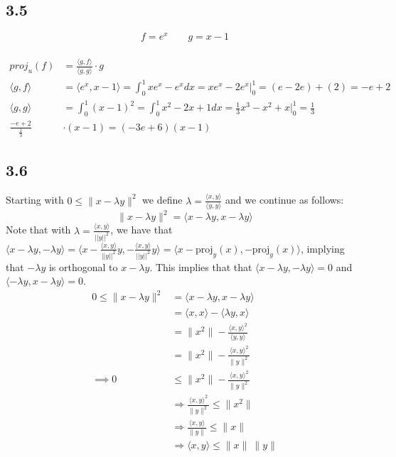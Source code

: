 \documentclass[letterpaper,12pt]{article}
\theoremstyle{definition}
\begin{document}
\subsection*{3.5}
\[f = e^{x} ~~~~~~~~~ g = x-1 \] \\
\begin{align*}
proj_{u}(f) &= \frac{\langle g,f\rangle }{\langle g,g\rangle } \cdot g \\
\langle g,f\rangle  &= \langle e^{x}, x-1\rangle  = \int_{0}^{1}xe^{x} - e^{x} dx = xe^{x} - 2e^{x} |_{0}^{1} = (e-2e) + (2) = -e +2 \\ 
\langle g,g\rangle  &= \int_{0}^{1}(x-1)^{2} = \int_{0}^{1} x^{2} - 2x + 1 dx = \frac{1}{3}x^{3} - x^{2} + x |_{0}^{1} = \frac{1}{3} \\
\frac{-e+2}{\frac{1}{3}} &\cdot(x-1) = (-3e+6)(x-1)
\end{align*}

\subsection*{3.6}
Starting with  $0\leq\|x-\lambda y\|^{2}$ we define $\lambda = \frac{\langle x,y\rangle }{\langle y,y\rangle }$ and we continue as follows:
\[\|x-\lambda y\|^{2} = \langle x-\lambda y, x-\lambda y\rangle \]
Note that with $\lambda = \frac{\langle x,y \rangle}{||y||^2}$, we have that $\langle x - \lambda y, -\lambda y\rangle = \langle x -\frac{\langle x,y \rangle}{||y||^2}y, -\frac{\langle x,y \rangle}{||y||^2}y\rangle = \langle x - \text{proj}_y(x), -\text{proj}_y(x) \rangle$, implying that $-\lambda y$ is orthogonal to $x- \lambda y$.
This implies that that $\langle x-\lambda y,-\lambda y\rangle  = 0$ and $\langle -\lambda y, x-\lambda y\rangle  = 0$. 
 \begin{align*}
0 \leq \|x-\lambda y\|^{2} &= \langle x-\lambda y, x-\lambda y\rangle  \\
&= \langle x,x\rangle  - \langle \lambda y, x\rangle  \\
&= \| x^{2} \| - \frac{\langle x,y\rangle ^{2}}{\langle y,y\rangle } \\
&= \| x^{2} \| - \frac{\langle x,y\rangle ^{2}}{\|y\|^{2}} \\
\implies 0 &\leq \| x^{2} \| - \frac{\langle x,y\rangle ^{2}}{\|y\|^{2}} \\
&\Rightarrow \frac{\langle x,y\rangle ^{2}}{\|y\|^{2}} \leq \| x^{2} \| \\
&\Rightarrow \frac{\langle x,y\rangle }{\|y\|} \leq \| x \| \\
&\Rightarrow \langle x,y\rangle  \leq \| x \| ~\| y \| \\
\end{align*}
\end{document}
